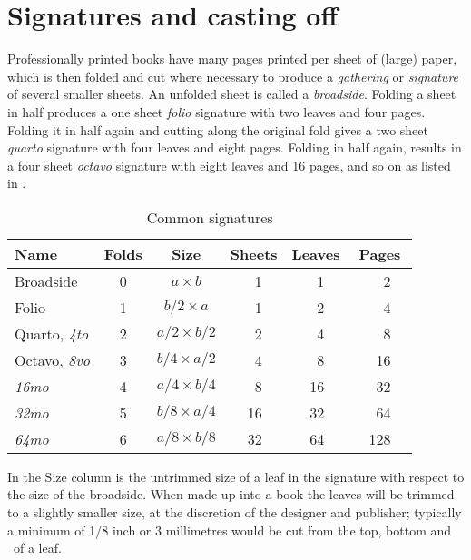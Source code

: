 \documentclass[10pt,letterpaper,extrafontsizes]{memoir}
\begin{document}
\section{Signatures and casting off}

    Professionally printed books have many pages printed per sheet of (large)
paper, which is then folded and cut where necessary to produce a 
\emph{gathering} or \emph{signature} of several smaller 
sheets. An 
unfolded sheet is called a \emph{broadside}. 
Folding a sheet in half produces a one sheet 
\emph{folio} signature with two leaves and four pages. 
Folding it in half again and cutting along the original fold gives a 
two sheet \emph{quarto} signature with four leaves
and eight pages. 
Folding in half again, 
results in a four sheet \emph{octavo} signature with eight
leaves and 16 pages, and so on as listed in .

\begin{table}
\centering
\caption{Common signatures} \label{tab:signatures}
\begin{tabular}{lcccrccrccrc} \toprule
Name      & Folds & Size             & \multicolumn{3}{c}{Sheets} & 
\multicolumn{3}{c}{Leaves} & \multicolumn{3}{c}{Pages} \\ \midrule
Broadside & 0     & $a \times b$     & &  1 & & &  1 & & &   2 & \\
Folio     & 1     & $b/2 \times a$   & &  1 & & &  2 & & &   4 & \\
Quarto, \emph{4to} & 2 & $a/2 \times b/2$ & & 2 & & & 4 & & & 8 & \\
Octavo, \emph{8vo} & 3 & $b/4 \times a/2$ & & 4 & & & 8 & & & 16 & \\
\emph{16mo} & 4   & $a/4 \times b/4$ & &  8 & & & 16 & & &  32 & \\
\emph{32mo} & 5   & $b/8 \times a/4$ & & 16 & & & 32 & & &  64 & \\
\emph{64mo} & 6   & $a/8 \times b/8$ & & 32 & & & 64 & & & 128 & \\ \bottomrule
\end{tabular}%
%
%
\end{table}

    In  the Size column is the untrimmed size of a 
leaf in 
the signature
with respect to the size of the broadside. When made up into a book the
leaves will be trimmed to a slightly smaller size, at the discretion of the
designer and publisher; typically a minimum of 1/8 inch or 3 millimetres
would be cut from the top, bottom and \foredge\ of a leaf.
\end{document}
